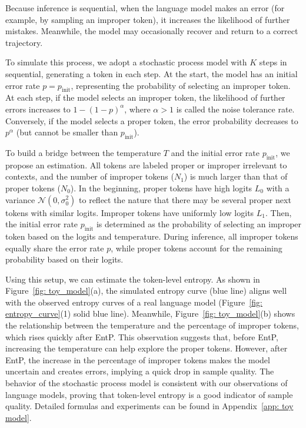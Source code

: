 Because inference is sequential, when the language model makes an error (for example, by sampling an improper token), it increases the likelihood of further mistakes. Meanwhile, the model may occasionally recover and return to a correct trajectory.

To simulate this process, we adopt a stochastic process model with \(K\) steps in sequential, generating a token in each step. At the start, the model has an initial error rate \(p = p_{\text{init}}\), representing the probability of selecting an improper token. At each step, if the model selects an improper token, the likelihood of further errors increases to \(1 - (1 - p)^\alpha\), where \(\alpha > 1\) is called the noise tolerance rate. Conversely, if the model selects a proper token, the error probability decreases to \(p^\alpha\) (but cannot be smaller than \(p_\text{init}\)).

To build a bridge between the temperature \(T\) and the initial error rate \(p_{\text{init}}\), we propose an estimation. All tokens are labeled proper or improper irrelevant to contexts, and the number of improper tokens (\(N_1\)) is much larger than that of proper tokens (\(N_0\)). In the beginning, proper tokens have high logits \(L_0\) with a variance \(\mathcal{N}(0, \sigma_0^2)\) to reflect the nature that there may be several proper next tokens with similar logits. Improper tokens have uniformly low logits \(L_1\). Then, the initial error rate \(p_{\text{init}}\) is determined as the probability of selecting an improper token based on the logits and temperature. 
During inference, all improper tokens equally share the error rate \(p\), while proper tokens account for the remaining probability based on their logits.

Using this setup, we can estimate the token-level entropy. As shown in Figure~\ref{fig: toy_model}(a), the simulated entropy curve (blue line) aligns well with the observed entropy curves of a real language model (Figure~\ref{fig: entropy_curve}(1) solid blue line). Meanwhile, Figure~\ref{fig: toy_model}(b) shows the relationship between the temperature and the percentage of improper tokens, which rises quickly after EntP. This observation suggests that, before EntP, increasing the temperature can help explore the proper tokens. However, after EntP, the increase in the percentage of improper tokens makes the model uncertain and creates errors, implying a quick drop in sample quality. The behavior of the stochastic process model is consistent with our observations of language models, proving that token-level entropy is a good indicator of sample quality. Detailed formulas and experiments can be found in Appendix~\ref{app: toy model}.

